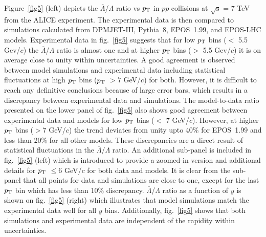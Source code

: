 \documentclass{article}
\newcommand{\sqrts}{\mbox{$\sqrt{\mathrm{s}}$}}
\newcommand{\alam}{$\overline{\Lambda}$}
\newcommand{\lam}{$\Lambda$}
\newcommand{\ppt}{$p_{\rm T}$}
\begin{document}
Figure~\ref{fig5} (left) depicts the {\alam /\lam} ratio vs {\ppt} in $pp$ collisions at {\sqrts} = 7 TeV from the ALICE experiment. The experimental data is then compared to simulations calculated from DPMJET-III, Pythia~8, EPOS~1.99, and EPOS-LHC models.  Experimental data in fig.~\ref{fig5} suggests that for low {\ppt} bins ($<$ 5.5 Gev/$c$) the {\alam /\lam} ratio is almost one and at higher {\ppt} bins ($>$ 5.5 Gev/$c$) it is  on average close to unity within uncertainties. A good agreement is observed between model simulations and experimental data including  statistical fluctuations at high {\ppt} bins ({\ppt} $> 7$ GeV/$c$) for both. However, it is difficult to reach any definitive conclusions because of large error bars, which results in a discrepancy between experimental data and simulations. The model-to-data ratio presented on the lower panel of fig.~\ref{fig5} also shows good agreement between experimental data and models for low {\ppt} bins ($<$ 7 GeV/$c$). However, at higher {\ppt} bins ($> 7$ GeV/$c$) the trend deviates from unity upto 40\% for EPOS~1.99 and less than 20\% for all other models. These discrepancies are a direct result of statistical fluctuations in the {\alam /\lam} ratio. An additional sub-panel is included in  fig.~\ref{fig5} (left) which is introduced to provide a zoomed-in version and additional details for {\ppt} $\leq 6$ GeV/$c$ for both data and models. It is clear from the sub-panel that all points for data and simulations are close to one, except for the last {\ppt} bin which has less than 10\% discrepancy.  
{\alam /\lam} ratio as a function of $y$ is shown on fig.~\ref{fig5} (right) which illustrates that model simulations match the experimental data well for all $y$ bins. Additionally, fig.~\ref{fig5} shows that both simulations and experimental data are independent of the rapidity within uncertainties.   
\end{document}
